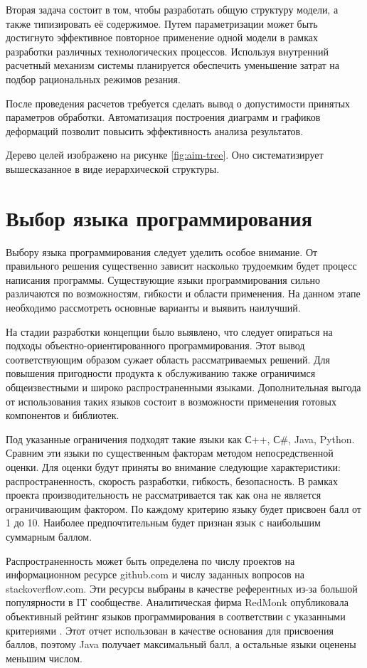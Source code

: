 \documentclass[14pt,oneside,final]{extreport}
\begin{document}
	Вторая задача состоит в том, чтобы разработать общую структуру модели, а также типизировать её содержимое. Путем параметризации может быть достигнуто эффективное повторное применение одной модели в рамках разработки различных технологических процессов. Используя внутренний расчетный механизм системы планируется обеспечить уменьшение затрат на подбор рациональных режимов резания. 
	
	После проведения расчетов требуется сделать вывод о допустимости принятых параметров обработки. Автоматизация построения диаграмм и графиков деформаций позволит повысить эффективность анализа результатов. 
	
	Дерево целей изображено на рисунке \ref{fig:aim-tree}. Оно систематизирует вышесказанное в виде иерархической структуры. 
		
	
				
	\section{Выбор языка программирования}
	Выбору языка программирования следует уделить особое внимание. От правильного решения существенно зависит насколько трудоемким будет процесс написания программы. Существующие языки программирования сильно различаются по возможностям, гибкости и области применения. На данном этапе необходимо рассмотреть основные варианты и выявить наилучший. 
	
	На стадии разработки концепции было выявлено, что следует опираться на подходы объектно-ориентированного программирования. Этот вывод соответствующим образом сужает область рассматриваемых решений. Для повышения пригодности продукта к обслуживанию также ограничимся общеизвестными и широко распространенными языками. Дополнительная выгода от использования таких языков состоит в возможности применения готовых компонентов и библиотек. 
	
	Под указанные ограничения подходят такие языки как С++, С\#, Java, Python. Сравним эти языки по существенным факторам методом непосредственной оценки. Для оценки будут приняты во внимание следующие характеристики: распространенность, скорость разработки, гибкость, безопасность. В рамках проекта производительность не рассматривается так как она не является ограничивающим фактором. По каждому критерию языку будет присвоен балл от 1 до 10. Наиболее предпочтительным будет признан язык с наибольшим суммарным баллом. 
	
	Распространенность может быть определена по числу проектов на информационном ресурсе github.com и числу заданных вопросов на stackoverflow.com. Эти ресурсы выбраны в качестве референтных из-за большой популярности в IT сообществе. Аналитическая фирма RedMonk опубликовала объективный рейтинг языков программирования в соответствии с указанными критериями \cite{web:RedMonk}. Этот отчет использован в качестве основания для присвоения баллов, поэтому Java получает максимальный балл, а остальные языки оценены меньшим числом. 
	
\end{document}

